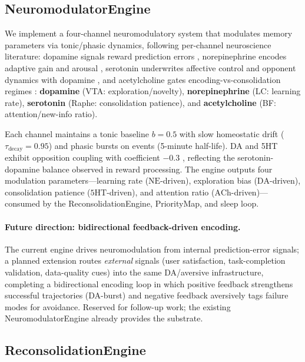 \documentclass{article}
\begin{document}
\subsection{NeuromodulatorEngine}
\label{sec:neuromod}

We implement a four-channel neuromodulatory system that modulates memory
parameters via tonic/phasic dynamics, following per-channel
neuroscience literature: dopamine signals reward prediction errors
\citep{schultz1997}, norepinephrine encodes adaptive gain and arousal
\citep{astonjones2005ne}, serotonin underwrites affective control and
opponent dynamics with dopamine \citep{dayan2012}, and acetylcholine
gates encoding-vs-consolidation regimes
\citep{hasselmo2004ach}:
\textbf{dopamine} (VTA: exploration/novelty), \textbf{norepinephrine}
(LC: learning rate), \textbf{serotonin} (Raphe: consolidation patience),
and \textbf{acetylcholine} (BF: attention/new-info ratio).

Each channel maintains a tonic baseline $b = 0.5$ with slow homeostatic
drift ($\tau_{\text{decay}} = 0.95$) and phasic bursts on events
(5-minute half-life).  DA and 5HT exhibit opposition coupling with
coefficient $-0.3$ \citep{daw2002}, reflecting the serotonin-dopamine
balance observed in reward processing.  The engine outputs four
modulation parameters---learning rate ($\text{NE}$-driven), exploration
bias ($\text{DA}$-driven), consolidation patience ($\text{5HT}$-driven),
and attention ratio ($\text{ACh}$-driven)---consumed by the
ReconsolidationEngine, PriorityMap, and sleep loop.

\paragraph{Future direction: bidirectional feedback-driven encoding.}
The current engine drives neuromodulation from internal prediction-error
signals; a planned extension routes \emph{external} signals (user
satisfaction, task-completion validation, data-quality cues) into the
same DA/aversive infrastructure, completing a bidirectional encoding
loop in which positive feedback strengthens successful trajectories
(DA-burst) and negative feedback aversively tags failure modes for
avoidance. Reserved for follow-up work; the existing
NeuromodulatorEngine already provides the substrate.

\subsection{ReconsolidationEngine}
\label{sec:recon}
\end{document}
